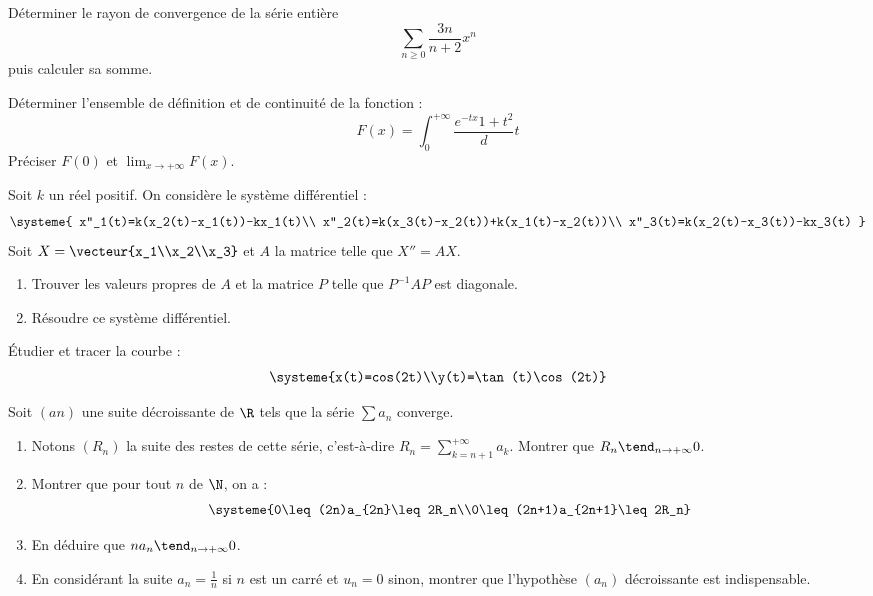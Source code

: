 \documentclass[french,11pt,twoside]{VcCours}
\begin{document}
\begin{Exercice}
  Déterminer le rayon de convergence de la série entière
  \[\sum_{n\geq0}\frac{3n}{n+2}x^n\]
  puis calculer sa somme.
\end{Exercice}


\begin{Exercice}
  Déterminer l'ensemble de définition et de continuité de la fonction :
  \[F(x)=\int_0^{+\infty}\frac{e^{-tx}{1+t^2}}dt\]
  Préciser $F(0)$ et $\lim_{x\to+\infty}F(x)$.
\end{Exercice}


\begin{Exercice}
  Soit $k$ un réel positif. On considère le système différentiel :
  \[\systeme{
      x''_1(t)=k(x_2(t)-x_1(t))-kx_1(t)\\
      x''_2(t)=k(x_3(t)-x_2(t))+k(x_1(t)-x_2(t))\\
      x''_3(t)=k(x_2(t)-x_3(t))-kx_3(t)
    }
  \]
  Soit $X=\vecteur{x_1\\x_2\\x_3}$ et $A$ la matrice telle que $X''=AX$.
  \begin{enumerate}
    \item Trouver les valeurs propres de $A$
    et la matrice $P$ telle que $P^{-1}AP$ est diagonale.
    \item Résoudre ce système différentiel.
\end{enumerate}
\end{Exercice}


\begin{Exercice}
  Étudier et tracer la courbe :
  \[\systeme{x(t)=cos(2t)\\y(t)=\tan(t)\cos(2t)}\]
\end{Exercice}


\begin{Exercice}
  Soit $(an)$ une suite décroissante de $\R$ tels que la série $\sum a_n$ converge.
  \begin{enumerate}
    \item Notons $(R_n)$ la suite des restes de cette série, c'est-à-dire $R_n =
    \sum_{k=n+1}^{+\infty}a_k$. Montrer que $R_n\tend_{n\to+\infty}0$.
    \item Montrer que pour tout $n$ de $\N$, on a :
  \[\systeme{0\leq(2n)a_{2n}\leq2R_n\\0\leq(2n+1)a_{2n+1}\leq2R_n}\]
  \item En déduire que $na_n\tend_{n\to+\infty}0$.
  \item En considérant la suite $a_n=\frac1n$ si $n$ est un carré et $u_n = 0$ sinon, 
  montrer que l'hypothèse $(a_n)$ décroissante est indispensable.
\end{enumerate}
\end{Exercice}
\end{document}
